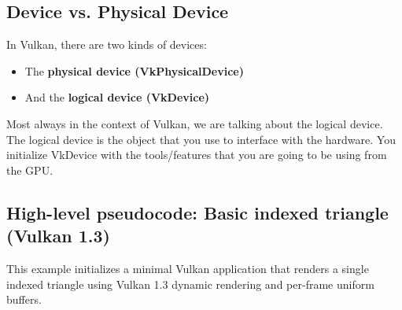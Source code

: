 \documentclass{article}
\begin{document}
\subsection*{Device vs. Physical Device}
\par In Vulkan, there are two kinds of devices:
\begin{itemize}
  \item The \textbf{physical device (VkPhysicalDevice)}
  \item And the \textbf{logical device (VkDevice)}
\end{itemize}
\par Most always in the context of Vulkan, we are talking about the
logical device. The logical device is the object that you use to
interface with the hardware. You initialize VkDevice with the
tools/features that you are going to be using from the GPU.

\subsection*{High-level pseudocode: Basic indexed triangle (Vulkan 1.3)}

This example initializes a minimal Vulkan application that renders a
single indexed triangle using Vulkan 1.3 dynamic rendering and
per-frame uniform buffers.
\end{document}
